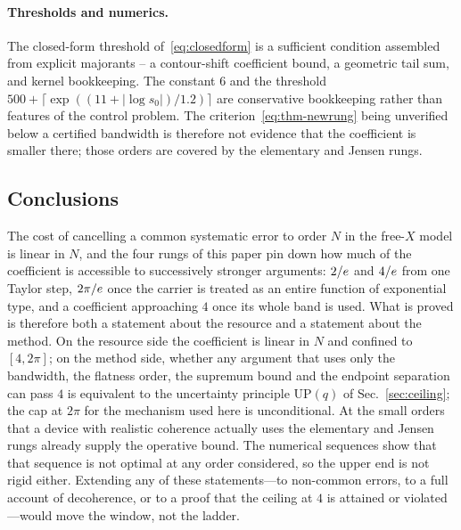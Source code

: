 \paragraph{Thresholds and numerics.} The closed-form threshold of~\eqref{eq:closedform} is
a sufficient condition assembled from explicit majorants -- a contour-shift coefficient
bound, a geometric tail sum, and kernel bookkeeping. The constant $6$ and the threshold
$500+\lceil\exp((11+|\log s_0|)/1.2)\rceil$ are conservative bookkeeping rather than
features of the control problem. The criterion~\eqref{eq:thm-newrung} being unverified
below a certified bandwidth is therefore not evidence that the coefficient is smaller
there; those orders are covered by the elementary and Jensen rungs.


\subsection{Conclusions}

The cost of cancelling a common systematic error to order $N$ in the free-$X$ model is
linear in $N$, and the four rungs of this paper pin down how much of the coefficient is
accessible to successively stronger arguments: $2/e$ and $4/e$ from one Taylor step,
$2\pi/e$ once the carrier is treated as an entire function of exponential type, and a
coefficient approaching $4$ once its whole band is used. What is proved is therefore both a
statement about the resource and a statement about the method. On the resource side the
coefficient is linear in $N$ and confined to $[4,2\pi]$; on the method side, whether any
argument that uses only the bandwidth, the flatness order, the supremum bound and the endpoint
separation can pass $4$ is equivalent to the uncertainty principle $\mathrm{UP}(q)$ of
Sec.~\ref{sec:ceiling}; the cap at $2\pi$ for the mechanism used here is unconditional. At the small orders
that a device with realistic coherence actually uses the elementary and Jensen rungs already
supply the operative bound. The numerical sequences show that that sequence is not
optimal at any order considered, so the upper end is not rigid either. Extending any of these
statements---to non-common errors, to a full account of decoherence, or to a proof that the
ceiling at $4$ is attained or violated---would move the window, not the ladder.
